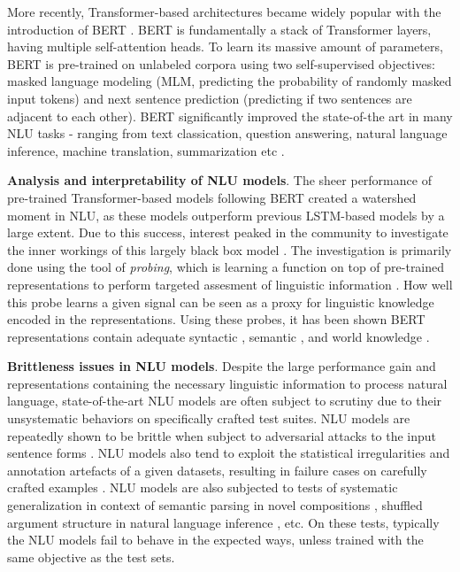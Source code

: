 \documentclass[12pt]{article}
\newcommand{\xhdr}[1]{{\noindent\bfseries #1}.}
\begin{document}
More recently, Transformer-based architectures became widely popular with the introduction of BERT \cite{devlin2018bert}. BERT is fundamentally a stack of Transformer layers, having multiple self-attention heads. To learn its massive amount of parameters, BERT is pre-trained on unlabeled corpora using two self-supervised objectives: masked language modeling (MLM, predicting the probability of randomly masked input tokens) and next sentence prediction (predicting if two sentences are adjacent to each other). BERT significantly improved the state-of-the art in many NLU tasks - ranging from text classication, question answering, natural language inference, machine translation, summarization etc \cite{qiu2020}.

\xhdr{Analysis and interpretability of NLU models}
The sheer performance of pre-trained Transformer-based models following BERT created a watershed moment in NLU, as these models outperform previous LSTM-based models by a large extent. Due to this success, interest peaked in the community to investigate the inner workings of this largely black box model \cite{rogers2020}. The investigation is primarily done using the tool of \textit{probing}, which is learning a function on top of pre-trained representations to perform targeted assesment of linguistic information \cite{hupkes2018visualisation}. How well this probe learns a given signal can be seen as a proxy for linguistic knowledge encoded in the representations. Using these probes, it has been shown BERT representations contain adequate syntactic \cite{hewitt-manning-2019-structural,jawahar-etal-2019-bert}, semantic \cite{tenney-etal-2019-bert,ettinger2020}, and world knowledge \cite{petroni2019language, rogers2020}.

\xhdr{Brittleness issues in NLU models} Despite the large performance gain and representations containing the necessary linguistic information to process natural language, state-of-the-art NLU models are often subject to scrutiny due to their unsystematic behaviors on specifically crafted test suites. NLU models are repeatedly shown to be brittle when subject to adversarial attacks \cite{jia2016,jin2020bert} to the input sentence forms \cite{kaushik2018much}. NLU models also tend to exploit the statistical irregularities and annotation artefacts \cite{gururangan2018a,poliak-etal-2018-hypothesis,tsuchiya-2018-performance} of a given datasets, resulting in failure cases on carefully crafted examples \cite{naik-etal-2018-stress,mccoy2019}.
NLU models are also subjected to tests of systematic generalization in context of semantic parsing in novel compositions \cite{lake2017generalization}, shuffled argument structure in natural language inference \cite{dasgupta-etal-2018-evaluating}, etc. On these tests, typically the NLU models fail to behave in the expected ways, unless trained with the same objective as the test sets.
\end{document}
